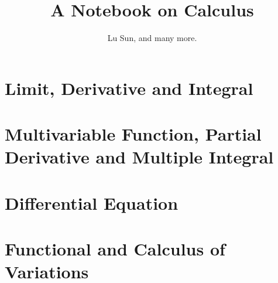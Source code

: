 \documentclass[krantz1,ChapterTOCs]{krantz}
\begin{document}
\frontmatter

\title{A Notebook on Calculus}
\author{Lu Sun, and many more.}

\maketitle


\tableofcontents


\listoffigures
\listoftables
%
%

\mainmatter

\part{Limit, Derivative and Integral}








\part{Multivariable Function, Partial Derivative and Multiple Integral}









\part{Differential Equation}







\part{Functional and Calculus of Variations}






\printindex
\end{document}
